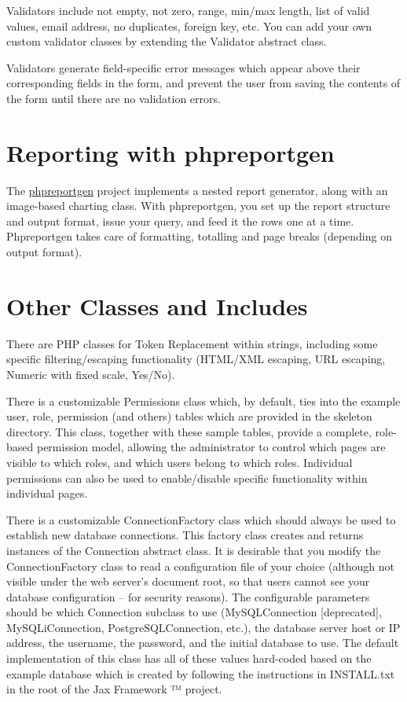 \documentclass[letterpaper,10pt,english]{sphinxmanual}
\begin{document}
Validators include not empty, not zero, range, min/max length, list of valid values, email address,
no duplicates, foreign key, etc.  You can add your own custom validator classes by extending the
Validator abstract class.

Validators generate field-specific error messages which appear above their corresponding fields in
the form, and prevent the user from saving the contents of the form until there are no validation
errors.


\section{Reporting with phpreportgen}
\label{jaxFrameworkGuide:reporting-with-phpreportgen}
The \href{http://phpreportgen.sourceforge.net/}{phpreportgen} project implements a nested report
generator, along with an image-based charting class.  With phpreportgen, you set up the report
structure and output format, issue your query, and feed it the rows one at a time.  Phpreportgen
takes care of formatting, totalling and page breaks (depending on output format).


\section{Other Classes and Includes}
\label{jaxFrameworkGuide:other-classes-and-includes}
There are PHP classes for Token Replacement within strings, including some specific
filtering/escaping functionality (HTML/XML escaping, URL escaping, Numeric with fixed scale,
Yes/No).

There is a customizable Permissions class which, by default, ties into the example user, role,
permission (and others) tables which are provided in the skeleton directory.  This class, together
with these sample tables, provide a complete, role-based permission model, allowing the
administrator to control which pages are visible to which roles, and which users belong to which
roles.  Individual permissions can also be used to enable/disable specific functionality within
individual pages.

There is a customizable ConnectionFactory class which should always be used to establish new
database connections.  This factory class creates and returns instances of the Connection abstract
class.  It is desirable that you modify the ConnectionFactory class to read a configuration file of
your choice (although not visible under the web server's document root, so that users cannot see
your database configuration -- for security reasons).  The configurable parameters should be which
Connection subclass to use (MySQLConnection {[}deprecated{]}, MySQLiConnection, PostgreSQLConnection,
etc.), the database server host or IP address, the username, the password, and the initial database
to use.  The default implementation of this class has all of these values hard-coded based on the
example database which is created by following the instructions in INSTALL.txt in the root of the
Jax Framework ™ project.
\end{document}
